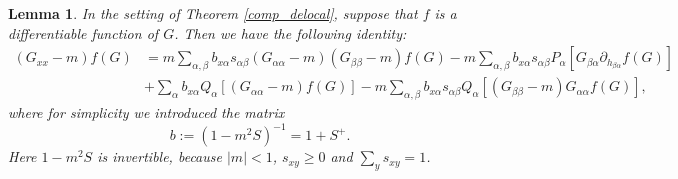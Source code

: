 \documentclass{article}
\newcommand{\1}{\mathds{1}}
\numberwithin{equation}{section}
\newcommand{\al}{\alpha}
\newcommand{\be}{\begin{equation}}
\newcommand{\ee}{\end{equation}}
\renewcommand{\geq}{\geqslant}
\renewcommand{\ge}{\geq}
\theoremstyle{plain} %
\newtheorem{lemma}[theorem]{Lemma}
\theoremstyle{remark}
\newcommand{\cor}{\color{red}}
\newcommand{\nc}{\normalcolor}
\begin{document}
 
\begin{lemma} \label{ssl} %
In the setting of Theorem \ref{comp_delocal}, suppose that $f$ is a differentiable function of $G$. Then we have the following identity:  %
\be\label{weightG}
\begin{split} 
     (G_{xx}  -  m) f(G)  & = m \sum_{\al,\beta}b_{x\al} s_{\al\beta} (G_{\al\al}-m) (G_{\beta\beta}-m) f(G) -  m \sum_{\al,\beta} b_{x\al} s_{\al\beta} P_\al  \left[ G_{\beta\al }\partial_{  h_{ \beta \al}} f(G)\right]  \\
  &+ \sum_{\al}b_{x\al}Q_\al \left[(G_{\al\al}  -  m) f(G)\right]  - m \sum_{\al,\beta}b_{x\al}s_{\al\beta}Q_\al\left[  (G_{\beta\beta}-m)G_{\al\al} f(G) \right] ,
\end{split} 
\ee
where for simplicity we introduced the matrix
\be\label{defn b}  b:= (1- m^2 S)^{-1} = 1 + S^+  .\ee
Here $1-m^2S$ is invertible, because $|m|<1$, $s_{xy}\ge 0$ and $\sum_y s_{xy}=1$.
\end{lemma} 
\end{document}
